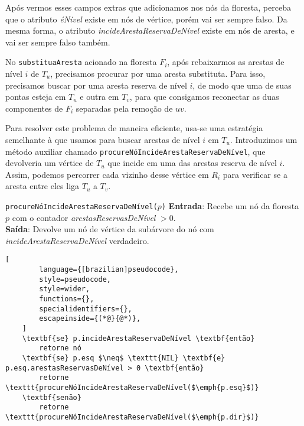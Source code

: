 \raggedbottom

Após vermos esses campos extras que adicionamos nos nós da floresta, perceba que o atributo \textit{éNível} existe em nós de vértice, porém vai ser sempre falso. Da mesma forma, o atributo \textit{incideArestaReservaDeNível} existe em nós de aresta, e vai ser sempre falso também. 
 
No \texttt{substituaAresta} acionado na floresta $F_i$, após rebaixarmos as arestas de nível $i$ de $T_u$, precisamos procurar por uma aresta substituta. Para isso, precisamos buscar por uma aresta reserva de nível $i$, de modo que uma de suas pontas esteja em $T_u$ e outra em $T_v$, para que consigamos reconectar as duas componentes de $F_i$ separadas pela remoção de $uv$. 

Para resolver este problema de maneira eficiente, usa-se uma estratégia semelhante à que usamos para buscar arestas de nível $i$ em $T_u$. Introduzimos um método auxiliar chamado \texttt{procureNóIncideArestaReservaDeNível}, que devolveria um vértice de $T_u$ que incide em uma das arestas reserva de nível $i$. Assim, podemos percorrer cada vizinho desse vértice em $R_i$ para verificar se a aresta entre eles liga $T_u$ a $T_v$. 

\begin{programruledcaption}{\texttt{procureNóIncideArestaReservaDeNível($p$)} \label{prog:findReserveEdge-GD}}
    \noindent\textbf{Entrada}: Recebe um nó da floresta $p$ com o contador \textit{arestasReservasDeNível} $> 0$.
    \\
    \noindent\textbf{Saída}: Devolve um nó de vértice da subárvore do nó com \textit{incideArestaReservaDeNível} verdadeiro.
    \vspace{-0.5\baselineskip}
    \begin{lstlisting}[
        language={[brazilian]pseudocode},
        style=pseudocode,
        style=wider,
        functions={},
        specialidentifiers={},
        escapeinside={(*@}{@*)},
    ]
    \textbf{se} p.incideArestaReservaDeNível \textbf{então}
        retorne nó
    \textbf{se} p.esq $\neq$ \texttt{NIL} \textbf{e} p.esq.arestasReservasDeNível > 0 \textbf{então}
        retorne \texttt{procureNóIncideArestaReservaDeNível($\emph{p.esq}$)}
    \textbf{senão}
        retorne \texttt{procureNóIncideArestaReservaDeNível($\emph{p.dir}$)}
\end{lstlisting}
\vspace{-0.5\baselineskip}
\end{programruledcaption}

